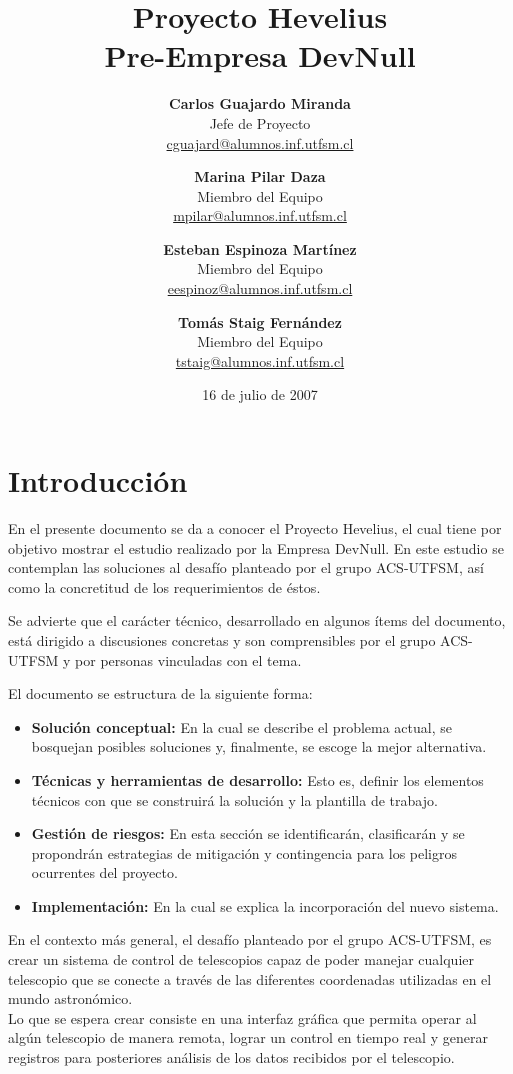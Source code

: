 \documentclass[letterpaper,titlepage,spanish,10pt]{article}
\title{{\Huge \bf Proyecto Hevelius} \\ {\Large Pre-Empresa DevNull}}
\author{
{\bf Carlos Guajardo Miranda} \\ Jefe de Proyecto \\ \url{cguajard@alumnos.inf.utfsm.cl}
\and
{\bf Marina Pilar Daza} \\ Miembro del Equipo \\ \url{mpilar@alumnos.inf.utfsm.cl}
\and
{\bf Esteban Espinoza Mart\'inez} \\ Miembro del Equipo \\ \url{eespinoz@alumnos.inf.utfsm.cl}
\and
{\bf Tom\'as Staig Fern\'andez} \\ Miembro del Equipo \\ \url{tstaig@alumnos.inf.utfsm.cl}
}
\date{16 de julio de 2007}
\begin{document}
\maketitle
\newpage

\tableofcontents{}
\newpage




\section{Introducci\'on}
En el presente documento se da a conocer el Proyecto Hevelius, el cual 
tiene por objetivo mostrar el estudio realizado por la Empresa DevNull. 
En este estudio se contemplan las soluciones al desaf\'io planteado por el grupo
ACS-UTFSM, as\'i como la concretitud de los requerimientos de \'estos.

Se advierte que el car\'acter t\'ecnico, desarrollado en algunos \'items del documento,
est\'a dirigido a discusiones concretas y son comprensibles por el grupo ACS-UTFSM 
y por personas vinculadas con el tema.

El documento se estructura de la siguiente forma:
\begin{itemize}
        \item \textbf{Soluci\'on conceptual:} En la cual se describe el problema 
actual, se bosquejan posibles soluciones y, finalmente, se escoge la mejor alternativa.
        \item \textbf{T\'ecnicas y herramientas de desarrollo:} Esto es, definir 
los elementos t\'ecnicos con que se construir\'a la soluci\'on y la plantilla de trabajo.
        \item \textbf{Gesti\'on de riesgos:} En esta secci\'on se identificar\'an, 
clasificar\'an y se propondr\'an estrategias de mitigaci\'on y contingencia para los 
peligros ocurrentes del proyecto.
        \item \textbf{Implementaci\'on:} En la cual se explica la incorporaci\'on del 
nuevo sistema.
\end{itemize}

En el contexto m\'as general, el desaf\'io planteado por el grupo ACS-UTFSM, es 
crear un sistema de control de telescopios capaz de poder manejar cualquier telescopio 
que se conecte a trav\'es de las diferentes coordenadas utilizadas en el mundo 
astron\'omico.\\

Lo que se espera crear consiste en una interfaz gr\'afica que permita operar al 
alg\'un telescopio de manera remota, lograr un control en tiempo real y generar 
registros para posteriores an\'alisis de los datos recibidos por el telescopio.\\
\end{document}
